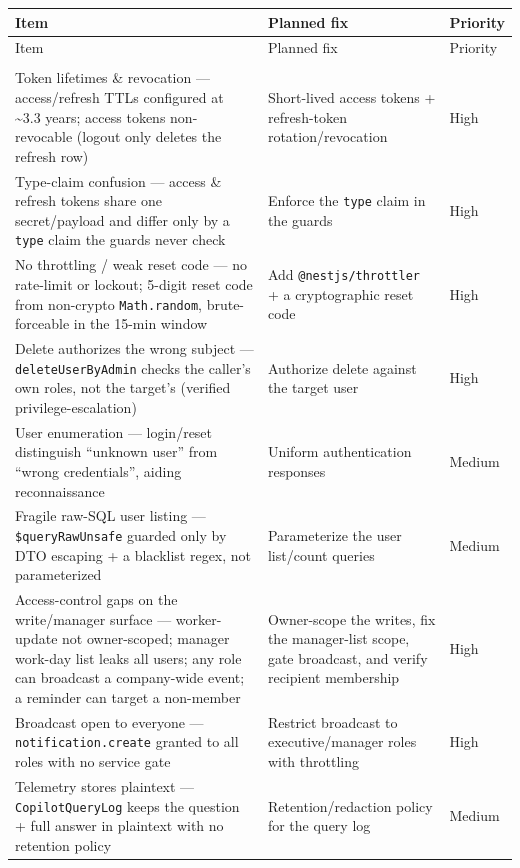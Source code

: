 \begin{longtable}{@{}>{\raggedright\arraybackslash}p{6.3cm}>{\raggedright\arraybackslash}p{6.5cm}>{\raggedright\arraybackslash}p{1.4cm}@{}}
\toprule
Item & Planned fix & Priority \\
\midrule
\endfirsthead
\toprule
Item & Planned fix & Priority \\
\midrule
\endhead
\multicolumn{3}{@{}l}{\textbf{Security}} \\*
\addlinespace[2pt]
Token lifetimes \& revocation --- access/refresh TTLs configured at \textasciitilde3.3 years; access tokens non-revocable (logout only deletes the refresh row) & Short-lived access tokens + refresh-token rotation/revocation & High \\
\midrule
Type-claim confusion --- access \& refresh tokens share one secret/payload and differ only by a \texttt{type} claim the guards never check & Enforce the \texttt{type} claim in the guards & High \\
\midrule
No throttling / weak reset code --- no rate-limit or lockout; 5-digit reset code from non-crypto \texttt{Math.random}, brute-forceable in the 15-min window & Add \texttt{@nestjs/throttler} + a cryptographic reset code & High \\
\midrule
Delete authorizes the wrong subject --- \texttt{deleteUserByAdmin} checks the caller's own roles, not the target's (verified privilege-escalation) & Authorize delete against the target user & High \\
\midrule
User enumeration --- login/reset distinguish ``unknown user'' from ``wrong credentials'', aiding reconnaissance & Uniform authentication responses & Medium \\
\midrule
Fragile raw-SQL user listing --- \texttt{\$queryRawUnsafe} guarded only by DTO escaping + a blacklist regex, not parameterized & Parameterize the user list/count queries & Medium \\
\midrule
Access-control gaps on the write/manager surface --- worker-update not owner-scoped; manager work-day list leaks all users; any role can broadcast a company-wide event; a reminder can target a non-member & Owner-scope the writes, fix the manager-list scope, gate broadcast, and verify recipient membership & High \\
\midrule
Broadcast open to everyone --- \texttt{notification.create} granted to all roles with no service gate & Restrict broadcast to executive/manager roles with throttling & High \\
\midrule
Telemetry stores plaintext --- \texttt{CopilotQueryLog} keeps the question + full answer in plaintext with no retention policy & Retention/redaction policy for the query log & Medium \\

\end{longtable}
